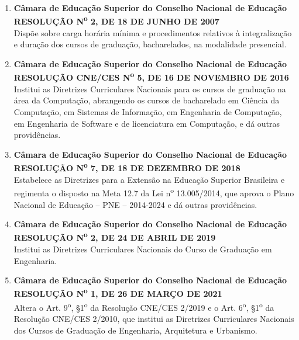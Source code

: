 \begin{enumerate}
    \item \textbf{Câmara de Educação Superior do Conselho Nacional de Educação}  \\
    \textbf{RESOLUÇÃO N\textsuperscript{o} 2, DE 18 DE JUNHO DE 2007}  \\
    Dispõe sobre carga horária mínima e procedimentos relativos à integralização e duração dos cursos de graduação, bacharelados, na modalidade presencial.
    
       \item \textbf{Câmara de Educação Superior do Conselho Nacional de Educação}  \\
    \textbf{RESOLUÇÃO CNE/CES N\textsuperscript{o} 5, DE 16 DE NOVEMBRO DE 2016}  \\
    Institui as Diretrizes Curriculares Nacionais para os cursos de graduação na área da Computação, abrangendo os cursos de bacharelado em Ciência da Computação, em Sistemas de Informação, em Engenharia de Computação, em Engenharia de Software e de licenciatura em Computação, e dá outras providências.

    \item \textbf{Câmara de Educação Superior do Conselho Nacional de Educação}  \\
    \textbf{RESOLUÇÃO N\textsuperscript{o} 7, DE 18 DE DEZEMBRO DE 2018}  \\
    Estabelece as Diretrizes para a Extensão na Educação Superior Brasileira e regimenta o disposto na Meta 12.7 da Lei n\textsuperscript{o} 13.005/2014, que aprova o Plano Nacional de Educação – PNE – 2014-2024 e dá outras providências.

    \item \textbf{Câmara de Educação Superior do Conselho Nacional de Educação}  \\
    \textbf{RESOLUÇÃO N\textsuperscript{o} 2, DE 24 DE ABRIL DE 2019}  \\
    Institui as Diretrizes Curriculares Nacionais do Curso de Graduação em Engenharia.

    \item \textbf{Câmara de Educação Superior do Conselho Nacional de Educação}  \\
    \textbf{RESOLUÇÃO N\textsuperscript{o} 1, DE 26 DE MARÇO DE 2021}  \\
    Altera o Art. 9\textsuperscript{o}, \S 1\textsuperscript{o} da Resolução CNE/CES 2/2019 e o Art. 6\textsuperscript{o}, \S 1\textsuperscript{o} da Resolução CNE/CES 2/2010, que institui as Diretrizes Curriculares Nacionais dos Cursos de Graduação de Engenharia, Arquitetura e Urbanismo.


\end{enumerate}

